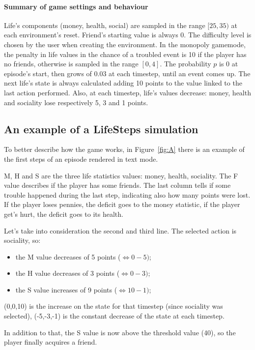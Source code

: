 \documentclass{article}
\begin{document}
\paragraph{Summary of game settings and behaviour} 
Life's components (money, health, social) are sampled in the range \([25, 35)\) at each environment's reset. Friend's starting value is always 0. The difficulty level is chosen by the user when creating the environment. In the monopoly gamemode, the penalty in life values in the chance of a troubled event is 10 if the player has no friends, otherwise is sampled in the range \([0,4]\). The probability \(p\) is 0 at episode's start, then grows of 0.03 at each timestep, until an event comes up.
The next life's state is always calculated adding 10 points to the value linked to the last action performed. Also, at each timestep, life's values decrease: money, health and sociality lose respectively 5, 3 and 1 points. 


\subsection{An example of a LifeSteps simulation}

To better describe how the game works, in Figure~\ref{fig:A} there is an example of the first steps of an episode rendered in text mode.

M, H and S are the three life statistics values: money, health, sociality. The F value describes if the player has some friends. The last column tells if some trouble happened during the last step, indicating also how many points were lost. If the player loses pennies, the deficit goes to the money statistic, if the player get's hurt, the deficit goes to its health.

Let's take into consideration the second and third line. The selected action is sociality, so:
\begin{itemize}
    \item the M value decreases of 5 points (\(\Leftrightarrow 0-5)\);
    \item the H value decreases of 3 points (\(\Leftrightarrow 0-3)\);
    \item the S value increases of 9 points (\(\Leftrightarrow 10-1)\);
\end{itemize}
(0,0,10) is the increase on the state for that timestep (since sociality was selected), (-5,-3,-1) is the constant decrease of the state at each timestep.

In addition to that, the S value is now above the threshold value (40), so the player finally acquires a friend.
\end{document}
